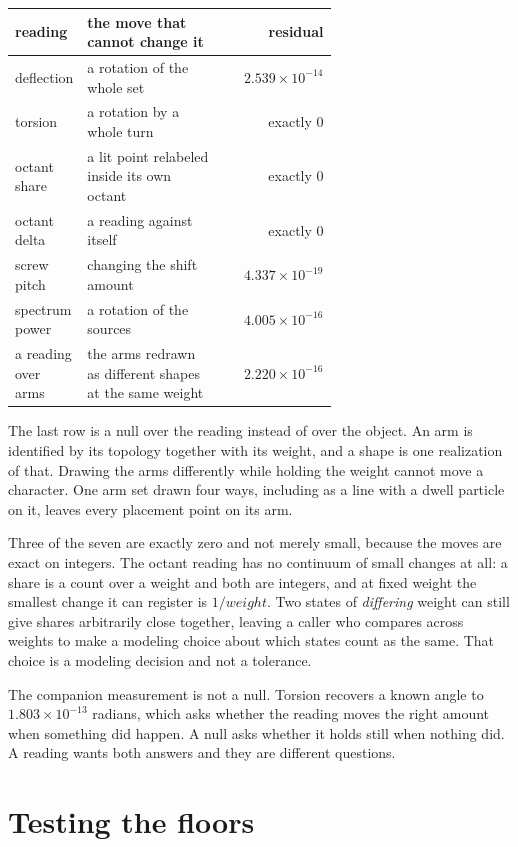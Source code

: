 \begin{center}
\begin{tabular}{@{}p{0.22\linewidth}p{0.42\linewidth}r@{}}
\toprule
reading & the move that cannot change it & residual \\
\midrule
deflection & a rotation of the whole set & \(2.539 \times 10^{-14}\) \\
torsion & a rotation by a whole turn & exactly 0 \\
octant share & a lit point relabeled inside its own octant & exactly 0 \\
octant delta & a reading against itself & exactly 0 \\
screw pitch & changing the shift amount & \(4.337 \times 10^{-19}\) \\
spectrum power & a rotation of the sources & \(4.005 \times 10^{-16}\) \\
a reading over arms & the arms redrawn as different shapes at the same weight & \(2.220 \times 10^{-16}\) \\
\bottomrule
\end{tabular}
\end{center}

The last row is a null over the reading instead of over the object. An arm is identified by its topology together with its weight, and a shape is one realization of that. Drawing the arms differently while holding the weight cannot move a character. One arm set drawn four ways, including as a line with a dwell particle on it, leaves every placement point on its arm.

Three of the seven are exactly zero and not merely small, because the moves are exact on integers. The octant reading has no continuum of small changes at all: a share is a count over a weight and both are integers, and at fixed weight the smallest change it can register is \(1/\mathit{weight}\). Two states of \emph{differing} weight can still give shares arbitrarily close together, leaving a caller who compares across weights to make a modeling choice about which states count as the same. That choice is a modeling decision and not a tolerance.

The companion measurement is not a null. Torsion recovers a known angle to \(1.803 \times 10^{-13}\) radians, which asks whether the reading moves the right amount when something did happen. A null asks whether it holds still when nothing did. A reading wants both answers and they are different questions.

\section{Testing the floors}

